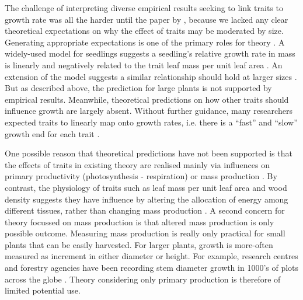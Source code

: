 \documentclass[a4paper,11pt]{article}
\begin{document}
The challenge of interpreting diverse empirical results seeking to link traits to growth rate was all the harder until the paper by \citet{Gibert-2016}, because we lacked any clear theoretical expectations on why the effect of traits may be moderated by size. Generating appropriate expectations is one of the primary roles for theory \citep{Kokko-2007}. A widely-used model for seedlings suggests a seedling's relative growth rate in mass is linearly and negatively related to the trait leaf mass per unit leaf area \citep{Lambers-1992, Cornelissen-1996, Wright-2000}. An extension of the model suggests a similar relationship should hold at larger sizes \citep{Enquist-2007}. But as described above, the prediction for large plants is not supported by empirical results. Meanwhile, theoretical predictions on how other traits should influence growth are largely absent. Without further guidance, many researchers expected traits to linearly map onto growth rates, i.e. there is a ``fast'' and ``slow'' growth end for each trait \citep[e.g.][]{Grime-1977, Poorter-2008, Chave-2009, Paine-2015}.

One possible reason that theoretical predictions have not been supported is that the effects of traits in existing theory are realised mainly via influences on primary productivity (photosynthesis - respiration) or mass production \citep{Enquist-2007}. By contrast, the physiology of traits such as leaf mass per unit leaf area and wood density suggests they have influence by altering the allocation of energy among different tissues, rather than changing mass production \citep{Falster-2011, Gibert-2016}. A second concern for theory focussed on mass production is that altered mass production is only possible outcome. Measuring mass production is really only practical for small plants that can be easily harvested. For larger plants, growth is more-often measured as increment in either diameter or height. For example, research centres and forestry agencies have been recording stem diameter growth in 1000's of plots across the globe \citep{Purves-2008, Anderson-2015, Kunstler-2016}. Theory considering only primary production is therefore of limited potential use.
\end{document}
